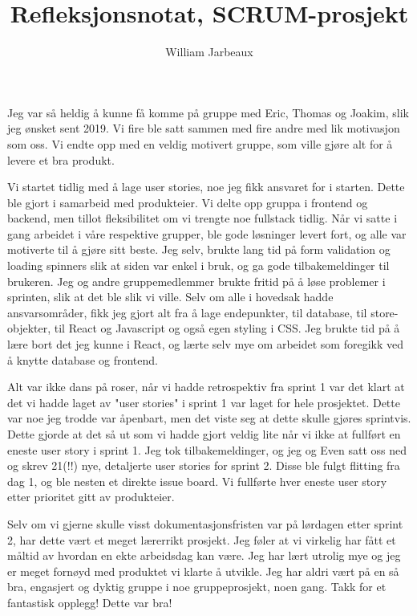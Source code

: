 \documentclass{article}
\title{Refleksjonsnotat, SCRUM-prosjekt}
\author{William Jarbeaux}
\begin{document}
    \maketitle
    \begin{flushleft}
    Jeg var så heldig å kunne få komme på gruppe med Eric, Thomas og Joakim, slik jeg ønsket sent 2019. 
    Vi fire ble satt sammen med fire andre med lik motivasjon som oss. Vi endte opp med en veldig motivert gruppe, som ville gjøre alt for å levere et bra produkt. 
    
    \bigskip
    Vi startet tidlig med å lage user stories, noe jeg fikk ansvaret for i starten. Dette ble gjort i samarbeid med produkteier. Vi delte opp gruppa i frontend og backend, men tillot fleksibilitet om vi trengte noe fullstack tidlig.
    Når vi satte i gang arbeidet i våre respektive grupper, ble gode løsninger levert fort, og alle var motiverte til å gjøre sitt beste. Jeg selv, brukte lang tid på form validation og loading spinners slik at siden var enkel i bruk, og ga gode tilbakemeldinger til brukeren.
    Jeg og andre gruppemedlemmer brukte fritid på å løse problemer i sprinten, slik at det ble slik vi ville.
    Selv om alle i hovedsak hadde ansvarsområder, fikk jeg gjort alt fra å lage endepunkter, til database, til store-objekter, til React og Javascript og også egen styling i CSS.
    Jeg brukte tid på å lære bort det jeg kunne i React, og lærte selv mye om arbeidet som foregikk ved å knytte database og frontend. 
    
    \bigskip
    Alt var ikke dans på roser, når vi hadde retrospektiv fra sprint 1 var det klart at det vi hadde laget av "user stories" i sprint 1 var laget for hele prosjektet. Dette var noe jeg trodde var åpenbart, men det viste seg at dette skulle gjøres sprintvis.
    Dette gjorde at det så ut som vi hadde gjort veldig lite når vi ikke at fullført en eneste user story i sprint 1. 
    Jeg tok tilbakemeldinger, og jeg og Even satt oss ned og skrev 21(!!) nye, detaljerte user stories for sprint 2. 
    Disse ble fulgt flitting fra dag 1, og ble nesten et direkte issue board. Vi fullførte hver eneste user story etter prioritet gitt av produkteier.
    
    
    \bigskip
    Selv om vi gjerne skulle visst dokumentasjonsfristen var på lørdagen etter sprint 2, har dette vært et meget lærerrikt prosjekt.
    Jeg føler at vi virkelig har fått et måltid av hvordan en ekte arbeidsdag kan være. Jeg har lært utrolig mye og jeg er meget fornøyd med produktet vi klarte å utvikle. 
    Jeg har aldri vært på en så bra, engasjert og dyktig gruppe i noe gruppeprosjekt, noen gang.
    Takk for et fantastisk opplegg! Dette var bra!


    \end{flushleft}
\end{document}
